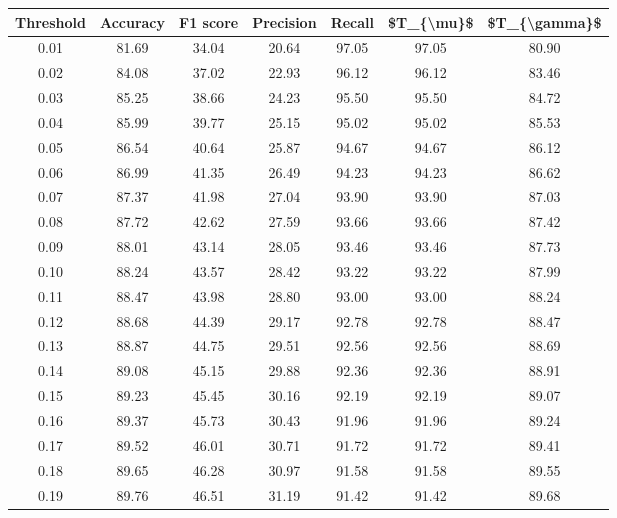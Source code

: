 \begin{tabular}{|c|c|c|c|c|c|c|}
\hline
 Threshold &  Accuracy &  F1 score &  Precision &  Recall &  \$T\_\{\textbackslash mu\}\$ &  \$T\_\{\textbackslash gamma\}\$ \\
\hline
      0.01 &     81.69 &     34.04 &      20.64 &   97.05 &      97.05 &         80.90 \\
      0.02 &     84.08 &     37.02 &      22.93 &   96.12 &      96.12 &         83.46 \\
      0.03 &     85.25 &     38.66 &      24.23 &   95.50 &      95.50 &         84.72 \\
      0.04 &     85.99 &     39.77 &      25.15 &   95.02 &      95.02 &         85.53 \\
      0.05 &     86.54 &     40.64 &      25.87 &   94.67 &      94.67 &         86.12 \\
      0.06 &     86.99 &     41.35 &      26.49 &   94.23 &      94.23 &         86.62 \\
      0.07 &     87.37 &     41.98 &      27.04 &   93.90 &      93.90 &         87.03 \\
      0.08 &     87.72 &     42.62 &      27.59 &   93.66 &      93.66 &         87.42 \\
      0.09 &     88.01 &     43.14 &      28.05 &   93.46 &      93.46 &         87.73 \\
      0.10 &     88.24 &     43.57 &      28.42 &   93.22 &      93.22 &         87.99 \\
      0.11 &     88.47 &     43.98 &      28.80 &   93.00 &      93.00 &         88.24 \\
      0.12 &     88.68 &     44.39 &      29.17 &   92.78 &      92.78 &         88.47 \\
      0.13 &     88.87 &     44.75 &      29.51 &   92.56 &      92.56 &         88.69 \\
      0.14 &     89.08 &     45.15 &      29.88 &   92.36 &      92.36 &         88.91 \\
      0.15 &     89.23 &     45.45 &      30.16 &   92.19 &      92.19 &         89.07 \\
      0.16 &     89.37 &     45.73 &      30.43 &   91.96 &      91.96 &         89.24 \\
      0.17 &     89.52 &     46.01 &      30.71 &   91.72 &      91.72 &         89.41 \\
      0.18 &     89.65 &     46.28 &      30.97 &   91.58 &      91.58 &         89.55 \\
      0.19 &     89.76 &     46.51 &      31.19 &   91.42 &      91.42 &         89.68 \\

\end{tabular}
